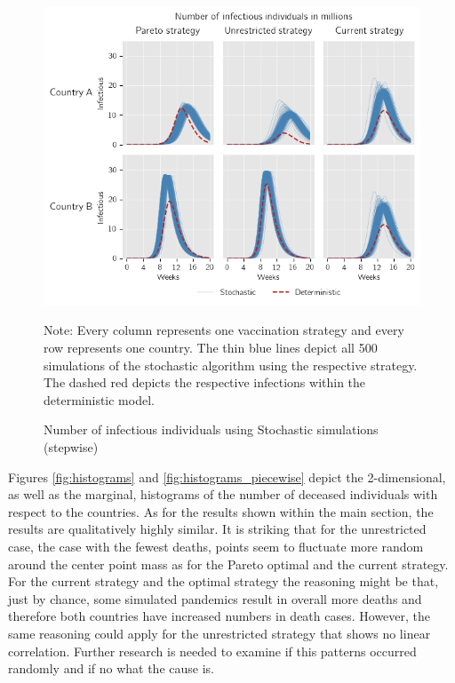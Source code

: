 \begin{figure}[h!]
\centering
\includegraphics[scale=0.75]{images/piecewise_stochastic_infectious.png}\\
\begin{flushleft}
\scriptsize{Note:} Every column represents one vaccination strategy and every row represents one country. The thin blue lines depict all 500 simulations of the stochastic algorithm using the respective strategy. The dashed red depicts the respective infections within the deterministic model. 
\end{flushleft}
\caption{Number of infectious individuals using Stochastic simulations (stepwise)}
\label{fig:results_piecewise_infectious_dead_stochastic}
\end{figure}
\newpage
Figures \ref{fig:histograms}  and \ref{fig:histograms_piecewise} depict the 2-dimensional, as well as the marginal, histograms of the number of deceased individuals with respect to the countries. As for the results shown within the main section, the results are qualitatively highly similar. It is striking that for the unrestricted case, the case with the fewest deaths, points seem to fluctuate more random around the center point mass as for the Pareto optimal and the current strategy. For the current strategy and the optimal strategy the reasoning might be that, just by chance, some simulated pandemics result in overall more deaths and therefore both countries have increased numbers in death cases. However, the same reasoning could apply for the unrestricted strategy that shows no linear correlation.
Further research is needed to examine if this patterns occurred randomly and if no what the cause is.
